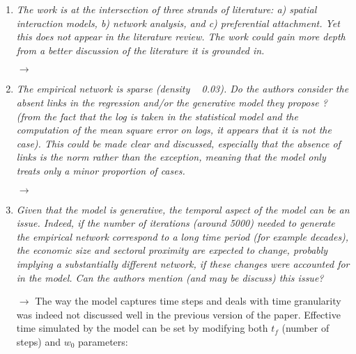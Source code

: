 \documentclass[10pt,a4paper,sans]{moderncv}        %
\begin{document}
\begin{enumerate}

	\item \textit{The work is at the intersection of three strands of literature: a) spatial interaction models, b) network analysis, and c) preferential attachment. Yet this does not appear in the literature review. The work could gain more depth from a better discussion of the literature it is grounded in.}
	
	$\rightarrow$ 
	
	\medskip


	\item \textit{The empirical network is sparse (density ~ 0.03). Do the authors consider the absent links in the regression and/or the generative model they propose ? (from the fact that the log is taken in the statistical model and the computation of the mean square error on logs, it appears that it is not the case). This could be made clear and discussed, especially that the absence of links is the norm rather than the exception, meaning that the model only treats only a minor proportion of cases.}
	
	$\rightarrow$ 
	
	\medskip


	\item \textit{Given that the model is generative, the temporal aspect of the model can be an issue. Indeed, if the number of iterations (around 5000) needed to generate the empirical network correspond to a long time period (for example decades), the economic size and sectoral proximity are expected to change, probably implying a substantially different network, if these changes were accounted for in the model. Can the authors mention (and may be discuss) this issue?}
	
	$\rightarrow$ The way the model captures time steps and deals with time granularity was indeed not discussed well in the previous version of the paper. Effective time simulated by the model can be set by modifying both $t_f$ (number of steps) and $w_0$ parameters: %

	\medskip


\end{enumerate}
\end{document}
